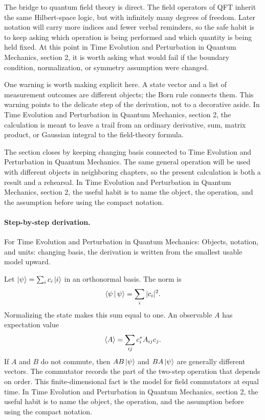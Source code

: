 The bridge to quantum field theory is direct.  The field operators of QFT inherit the same Hilbert-space logic, but with infinitely many degrees of freedom.  Later notation will carry more indices and fewer verbal reminders, so the safe habit is to keep asking which operation is being performed and which quantity is being held fixed.  At this point in Time Evolution and Perturbation in Quantum Mechanics, section 2, it is worth asking what would fail if the boundary condition, normalization, or symmetry assumption were changed.

One warning is worth making explicit here.  A state vector and a list of measurement outcomes are different objects; the Born rule connects them.  This warning points to the delicate step of the derivation, not to a decorative aside.  In Time Evolution and Perturbation in Quantum Mechanics, section 2, the calculation is meant to leave a trail from an ordinary derivative, sum, matrix product, or Gaussian integral to the field-theory formula.

The section closes by keeping changing basis connected to Time Evolution and Perturbation in Quantum Mechanics.  The same general operation will be used with different objects in neighboring chapters, so the present calculation is both a result and a rehearsal.  In Time Evolution and Perturbation in Quantum Mechanics, section 2, the useful habit is to name the object, the operation, and the assumption before using the compact notation.



\paragraph{Step-by-step derivation.}

For Time Evolution and Perturbation in Quantum Mechanics: Objects, notation, and units: changing basis, the derivation is written from the smallest usable model upward.

Let \(\left|\psi\right\rangle=\sum_i c_i\left|i\right\rangle\) in an orthonormal basis.  The norm is
\[
  \left\langle \psi\,\middle|\,\psi\right\rangle=\sum_i |c_i|^2.
\]
Normalizing the state makes this sum equal to one.  An observable \(A\) has expectation value
\[
  \left\langle A\right\rangle=\sum_{ij}c_i^*A_{ij}c_j.
\]
If \(A\) and \(B\) do not commute, then \(AB\left|\psi\right\rangle\) and \(BA\left|\psi\right\rangle\) are generally different vectors.  The commutator records the part of the two-step operation that depends on order.  This finite-dimensional fact is the model for field commutators at equal time.  In Time Evolution and Perturbation in Quantum Mechanics, section 2, the useful habit is to name the object, the operation, and the assumption before using the compact notation.

